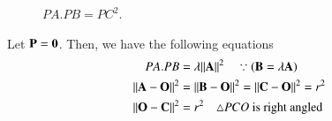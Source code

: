 \documentclass[journal,12pt,twocolumn]{IEEEtran}
\renewcommand\thesection{\arabic{section}}
\begin{document}
\begin{enumerate}[label=\thesection.\arabic*
,ref=\thesection.\theenumi]
\begin{figure}[!hb]
\begin{center}
			\resizebox{\columnwidth}{!}{}
		\end{center}
		\caption{$PA.PB = PC^2$.}
		\label{fig:tangent_secant}	
	\end{figure}
\solution Let $\mathbf{P} = \mathbf{0}$.  Then, we have the following equations
\begin{align}
\label{eq:tan_sec_AB}
PA.PB &= \lambda \lVert\mathbf{A}\rVert^2 \quad \because (\mathbf{B} = \lambda \mathbf{A})
\\
\lVert\mathbf{A}-\mathbf{O}\rVert^2 &= \lVert\mathbf{B}-\mathbf{O}\rVert^2 = \lVert\mathbf{C}-\mathbf{O}\rVert^2 = r^2
\\
\lVert\mathbf{O}-\mathbf{C}\rVert^2 &=  r^2 \quad \triangle PCO\text{ is right angled}
\label{eq:tan_sec_boudh}
\end{align}
\end{enumerate}
\end{document}
